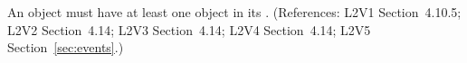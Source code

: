 An \Event object must have at least one \EventAssignment object in its
.  (References: L2V1 Section~4.10.5; L2V2
Section~4.14; L2V3 Section~4.14; L2V4 Section~4.14; L2V5 Section~\ref{sec:events}.)

